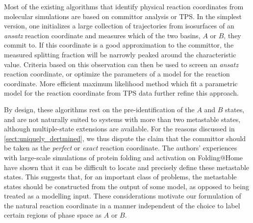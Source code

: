 \documentclass[aip, jcp, reprint, nolinenumbers, twocolumn, nobalancelastpage, nofootinbib]{revtex4-1}
\begin{document}
Most of the existing algorithms that identify physical reaction coordinates from molecular simulations are based on committor analysis or TPS.\cite{best2005reaction, ma2005automatic, peters2006obtaining, peters2007extensions, borrero2007reaction, peters2012inertial, peters2013reaction, peters2010peak} In the simplest version, one initializes a large collection of trajectories from isosurfaces of an \emph{ansatz} reaction coordinate and measures which of the two basins, $A$ or $B$, they commit to. If this coordinate is a good approximation to the committor, the measured splitting fraction will be narrowly peaked around the characteristic value.\cite{peters2006using} Criteria based on this observation can then be used to screen an \emph{ansatz} reaction coordinate, or optimize the parameters of a model for the reaction coordinate.\cite{ma2005automatic} More efficient maximum likelihood method which fit a parametric model for the reaction coordinate from TPS data further refine this approach.\cite{peters2007extensions, peters2012inertial}

By design, these algorithms rest on the pre-identification of the $A$ and $B$ states, and are not naturally suited to systems with more than two metastable states, although multiple-state extensions are available.\cite{rogal2008multiple} For the reasons discussed in \cref{sect:uniquely_dertmined}, we thus dispute the claim that the committor should be taken as the \emph{perfect} or \emph{exact} reaction coordinate.\cite{grunwald2009transition, ma2005automatic, peters2006obtaining, krivov2011numerical} The authors' experiences with large-scale simulations of protein folding and activation on Folding@Home have shown that it can be difficult to locate and precisely define these metastable states. This suggests that, for an important class of problems, the metastable states should be constructed from the output of some model, as opposed to being treated as a modelling input.\cite{shirts2000screen, voelz2010molecular, shukla2014activation} These considerations motivate our formulation of the natural reaction coordinate in a manner independent of the choice to label certain regions of phase space as $A$ or $B$.


\end{document}
